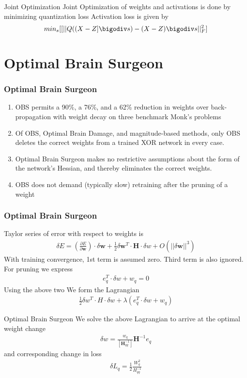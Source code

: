 \documentclass{beamer}
\theoremstyle{plain}
\theoremstyle{definition}
\theoremstyle{remark}
\numberwithin{equation}{section}
\numberwithin{figure}{section}
\numberwithin{theorem}{section}
\begin{document}
\begin{frame}{Joint Optimization}
Joint Optimization of weights and activations is done by minimizing quantization loss
Activation loss is given by
\begin{align}
    min_s[[||Q((X-Z]\bigodiv s) - (X-Z) \bigodiv s||^2_F]
\end{align}  
\end{frame}
\section{Optimal Brain Surgeon}
\begin{frame}
\frametitle{Optimal Brain Surgeon}
\begin{enumerate}
    \item OBS permits a 90\%, a 76\%, and a 62\% reduction in weights over back-propagation with weight decay on three benchmark Monk's problems 
    \item Of OBS, Optimal Brain Damage, and magnitude-based methods, only OBS deletes the correct weights from a trained XOR network in every case. 
    \item Optimal Brain Surgeon makes no restrictive assumptions about the form of the network's Hessian, and thereby eliminates the correct weights. 
    \item OBS does not demand (typically slow) retraining after the pruning of a weight
\end{enumerate}
\end{frame}
\begin{frame}[shrink]
\frametitle{Optimal Brain Surgeon}
Taylor series of error with respect to weights is 
\begin{align}
    \delta E = \left(\frac{\partial E }{\partial \mathbf{w}}\right) \cdot \delta\mathbf{w} + \frac{1}{2} \delta \mathbf{w}^T \cdot \mathbf{H} \cdot \delta w + O(|| \delta \mathbf{w} ||^3)
\end{align}
With training convergence, 1st term is assumed zero. Third term is also ignored.
For pruning we express
\begin{align}
    e^T_q \cdot \delta w  + w_q = 0
\end{align}
Using the above two We form the Lagrangian
\begin{align}
\frac{1}{2} \delta w^T \cdot H \cdot \delta w + \lambda (e^T_q \cdot \delta w + w_q)
\end{align}

\end{frame}
\begin{frame}{Optimal Brain Surgeon}
We solve the above Lagrangian to arrive at the optimal weight change
\begin{align}
    \delta w = \frac{w_q}{[\mathbf{H}^{-1}_{qq}]}\mathbf{H}^{-1} e_q
\end{align}
and corresponding change in loss
\begin{align}
\delta L_q = \frac{1}{2} \frac{W_q^2}{H^{-1}_{qq}}
\end{align}
\end{frame}
\end{document}
